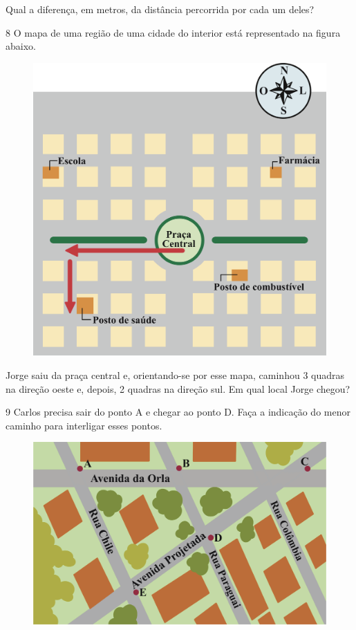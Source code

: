 Qual a diferença, em metros, da distância percorrida por cada um deles?


\num{8} O mapa de uma região de uma cidade do interior está representado na
figura abaixo.

\begin{figure}[htpb!]
\centering
\includegraphics[width=.5\textwidth]{./ilustras-mat/modulo_12-atividade_8_resposta.png}
\end{figure}

\pagebreak

Jorge saiu da praça central e, orientando-se por esse mapa, caminhou 3
quadras na direção oeste e, depois, 2 quadras na direção sul. Em qual
local Jorge chegou?


\num{9} Carlos precisa sair do ponto A e chegar ao ponto D. Faça a indicação
do menor caminho para interligar esses pontos.

\begin{figure}[htpb!]
\centering
\includegraphics[width=\textwidth]{./ilustras-mat/modulo_12-atividade_9.png}
\end{figure}


